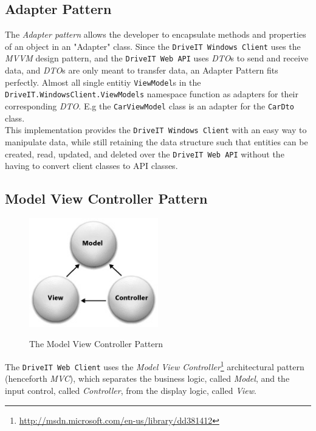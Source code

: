 \subsection{Adapter Pattern}
The \textit{Adapter pattern} allows the developer to encapsulate methods and properties of an object in an "Adapter" class. Since the \texttt{DriveIT Windows Client} uses the \textit{MVVM} design pattern, and the \texttt{DriveIT Web API} uses \textit{DTO}s to send and receive data, and \textit{DTO}s are only meant to transfer data, an Adapter Pattern fits perfectly. Almost all single entitiy \texttt{ViewModel}s in the \texttt{DriveIT.WindowsClient.ViewModels} namespace function as adapters for their corresponding \textit{DTO}. E.g the \texttt{CarViewModel} class is an adapter for the \texttt{CarDto} class.\\ 

This implementation provides the \texttt{DriveIT Windows Client} with an easy way to manipulate data, while still retaining the data structure such that entities can be created, read, updated, and deleted over the \texttt{DriveIT Web API} without the having to convert client classes to API classes.

\subsection{Model View Controller Pattern}
\label{sec:MVC}
\begin{figure}[H]
	\centering
	\includegraphics[width=0.5\textwidth]{Figures/WebImages/MVCPattern}\\
	\caption{The Model View Controller Pattern}
	\label{fig:MVCPattern}
\end{figure}
The \texttt{DriveIT Web Client} uses the \textit{Model View Controller}\footnote{\url{http://msdn.microsoft.com/en-us/library/dd381412}} architectural pattern (henceforth \textit{MVC}), which separates the business logic, called \textit{Model}, and the input control, called \textit{Controller}, from the display logic, called \textit{View}.

